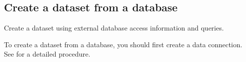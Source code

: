 \documentclass[letterpaper,10pt,english]{sphinxmanual}
\begin{document}
\subsection{Create a dataset from a database}
\label{\detokenize{discovery/part07/create_a_dataset:create-a-dataset-of-database}}\label{\detokenize{discovery/part07/create_a_dataset:id3}}
Create a dataset using external database access information and queries.

To create a dataset from a database, you should first create a data connection. See {\hyperref[\detokenize{discovery/part02/data_connection:create-data-connection}]{}} for a detailed procedure.
\begin{quote}

\begin{figure}[H]
\centering

\noindent{}
\end{figure}
\end{quote}
\end{document}

